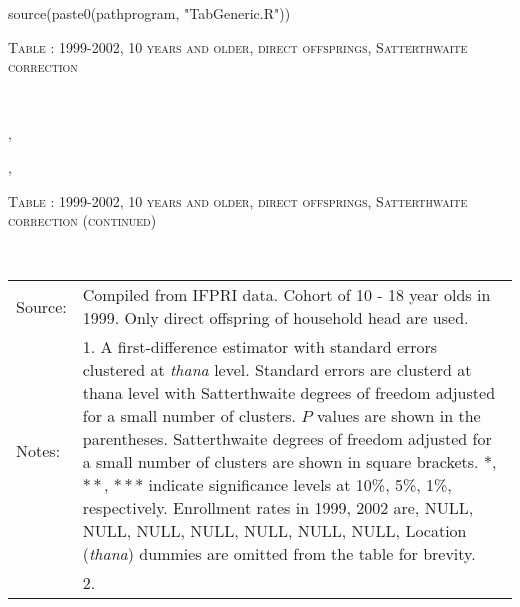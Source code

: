 \begin{Schunk}
\begin{Sinput}
source(paste0(pathprogram, "TabGeneric.R"))
\end{Sinput}
\end{Schunk}
\begin{table}\hfil\textsc{\footnotesize Table \thetable: 1999-2002, 10 years and older, direct offsprings, Satterthwaite correction\label{zEm.1999.10.sameN}}\\\setlength{\tabcolsep}{1pt}\renewcommand{\arraystretch}{.675}\hspace{-2em}\hfil{}\\\renewcommand{\arraystretch}{1}\end{table}, \addtocounter{table}{-1}, \begin{table}\hfil\textsc{\footnotesize Table \thetable: 1999-2002, 10 years and older, direct offsprings, Satterthwaite correction (continued)\label{zEm.1999.10.sameN}}\\\setlength{\tabcolsep}{1pt}\renewcommand{\arraystretch}{.675}\hspace{-2em}\hfil{}\\\renewcommand{\arraystretch}{1}\hfil\begin{tabular}{>{\hfill\scriptsize}p{1cm}<{}>{\scriptsize}p{12cm}<{\hfill}} Source:& Compiled from IFPRI data. Cohort of 10 - 18 year olds in 1999. Only direct offspring of household head are used.\\[-1ex] Notes:& 1. A first-difference estimator with standard errors clustered at \textit{thana} level. Standard errors are clusterd at thana level with Satterthwaite degrees of freedom adjusted for a small number of clusters. $P$ values are shown in the parentheses. Satterthwaite degrees of freedom adjusted for a small number of clusters are shown in square brackets. $*$, $**$, $***$ indicate significance levels at 10\%, 5\%, 1\%, respectively. Enrollment rates in 1999, 2002 are, NULL, NULL, NULL, NULL, NULL, NULL, NULL, Location (\textit{thana}) dummies are omitted from the table for brevity. \\ & 2.   \end{tabular} \end{table}

